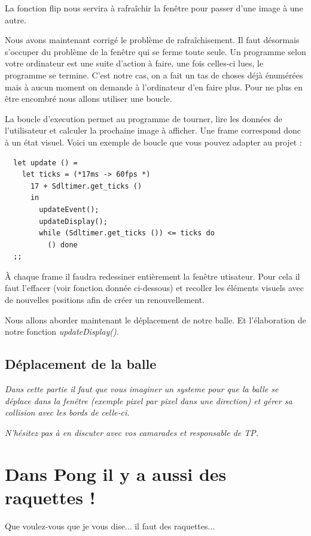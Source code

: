 \documentclass[a4paper]{article}
\begin{document}
\noindent
La fonction flip nous servira à rafraîchir la fenêtre pour passer d'une image à une autre.\bigskip

Nous avons maintenant corrigé le problème de rafraîchisement. Il faut désormais s'occuper du problème de la fenêtre qui se ferme toute seule. Un programme selon votre ordinateur est une suite d'action à faire, une fois celles-ci lues, le programme se termine. C'est notre cas, on a fait un tas de choses déjà énumérées mais à aucun moment on demande à l'ordinateur d'en faire plus. Pour ne plus en être encombré nous allons utiliser une boucle. \par

La boucle d'execution permet au programme de tourner, lire les données de l'utilisateur et calculer la prochaine image à afficher. Une frame correspond donc à un état visuel. Voici un exemple de boucle que vous pouvez adapter au projet :

\begin{lstlisting}
  let update () =
    let ticks = (*17ms -> 60fps *)
      17 + Sdltimer.get_ticks ()
      in
        updateEvent();
        updateDisplay();
        while (Sdltimer.get_ticks ()) <= ticks do
          () done
  ;;
\end{lstlisting}

À chaque frame il faudra redessiner entièrement la fenêtre utisateur. Pour cela il faut l'effacer (voir fonction donnée ci-dessous) et recoller les éléments visuels avec de nouvelles positions afin de créer un renouvellement.\par
Nous allons aborder maintenant le déplacement de notre balle. Et l'élaboration de notre fonction \textit{updateDisplay()}.

\subsection{Déplacement de la balle}

\textit{
Dans cette partie il faut que vous imaginer un systeme pour que la balle se déplace dans la fenêtre (exemple pixel par pixel dans une direction) et gérer sa collision avec les bords de celle-ci.
}\par\smallskip
\textit{N'hésitez pas à en discuter avec vos camarades et responsable de TP.}

\section{Dans Pong il y a aussi des raquettes !}

Que voulez-vous que je vous dise... il faut des raquettes...
\end{document}
